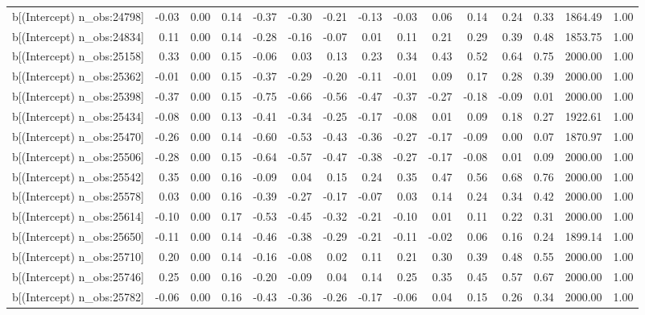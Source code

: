 \begin{table}[ht]
\begin{tabular}{rrrrrrrrrrrrrrr}
  b[(Intercept) n\_obs:24798] & -0.03 & 0.00 & 0.14 & -0.37 & -0.30 & -0.21 & -0.13 & -0.03 & 0.06 & 0.14 & 0.24 & 0.33 & 1864.49 & 1.00 \\ 
  b[(Intercept) n\_obs:24834] & 0.11 & 0.00 & 0.14 & -0.28 & -0.16 & -0.07 & 0.01 & 0.11 & 0.21 & 0.29 & 0.39 & 0.48 & 1853.75 & 1.00 \\ 
  b[(Intercept) n\_obs:25158] & 0.33 & 0.00 & 0.15 & -0.06 & 0.03 & 0.13 & 0.23 & 0.34 & 0.43 & 0.52 & 0.64 & 0.75 & 2000.00 & 1.00 \\ 
  b[(Intercept) n\_obs:25362] & -0.01 & 0.00 & 0.15 & -0.37 & -0.29 & -0.20 & -0.11 & -0.01 & 0.09 & 0.17 & 0.28 & 0.39 & 2000.00 & 1.00 \\ 
  b[(Intercept) n\_obs:25398] & -0.37 & 0.00 & 0.15 & -0.75 & -0.66 & -0.56 & -0.47 & -0.37 & -0.27 & -0.18 & -0.09 & 0.01 & 2000.00 & 1.00 \\ 
  b[(Intercept) n\_obs:25434] & -0.08 & 0.00 & 0.13 & -0.41 & -0.34 & -0.25 & -0.17 & -0.08 & 0.01 & 0.09 & 0.18 & 0.27 & 1922.61 & 1.00 \\ 
  b[(Intercept) n\_obs:25470] & -0.26 & 0.00 & 0.14 & -0.60 & -0.53 & -0.43 & -0.36 & -0.27 & -0.17 & -0.09 & 0.00 & 0.07 & 1870.97 & 1.00 \\ 
  b[(Intercept) n\_obs:25506] & -0.28 & 0.00 & 0.15 & -0.64 & -0.57 & -0.47 & -0.38 & -0.27 & -0.17 & -0.08 & 0.01 & 0.09 & 2000.00 & 1.00 \\ 
  b[(Intercept) n\_obs:25542] & 0.35 & 0.00 & 0.16 & -0.09 & 0.04 & 0.15 & 0.24 & 0.35 & 0.47 & 0.56 & 0.68 & 0.76 & 2000.00 & 1.00 \\ 
  b[(Intercept) n\_obs:25578] & 0.03 & 0.00 & 0.16 & -0.39 & -0.27 & -0.17 & -0.07 & 0.03 & 0.14 & 0.24 & 0.34 & 0.42 & 2000.00 & 1.00 \\ 
  b[(Intercept) n\_obs:25614] & -0.10 & 0.00 & 0.17 & -0.53 & -0.45 & -0.32 & -0.21 & -0.10 & 0.01 & 0.11 & 0.22 & 0.31 & 2000.00 & 1.00 \\ 
  b[(Intercept) n\_obs:25650] & -0.11 & 0.00 & 0.14 & -0.46 & -0.38 & -0.29 & -0.21 & -0.11 & -0.02 & 0.06 & 0.16 & 0.24 & 1899.14 & 1.00 \\ 
  b[(Intercept) n\_obs:25710] & 0.20 & 0.00 & 0.14 & -0.16 & -0.08 & 0.02 & 0.11 & 0.21 & 0.30 & 0.39 & 0.48 & 0.55 & 2000.00 & 1.00 \\ 
  b[(Intercept) n\_obs:25746] & 0.25 & 0.00 & 0.16 & -0.20 & -0.09 & 0.04 & 0.14 & 0.25 & 0.35 & 0.45 & 0.57 & 0.67 & 2000.00 & 1.00 \\ 
  b[(Intercept) n\_obs:25782] & -0.06 & 0.00 & 0.16 & -0.43 & -0.36 & -0.26 & -0.17 & -0.06 & 0.04 & 0.15 & 0.26 & 0.34 & 2000.00 & 1.00 \\ 

\end{tabular}
\end{table}
